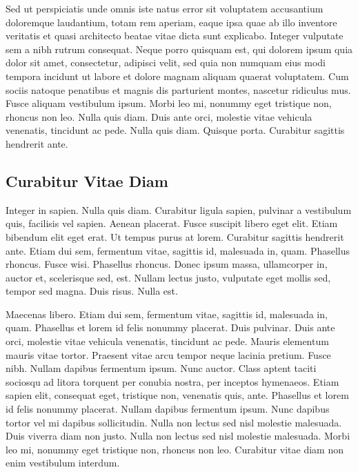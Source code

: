 Sed ut perspiciatis unde omnis iste natus error sit voluptatem accusantium doloremque laudantium, totam rem aperiam, eaque ipsa quae ab illo inventore veritatis et quasi architecto beatae vitae dicta sunt explicabo. Integer vulputate sem a nibh rutrum consequat. Neque porro quisquam est, qui dolorem ipsum quia dolor sit amet, consectetur, adipisci velit, sed quia non numquam eius modi tempora incidunt ut labore et dolore magnam aliquam quaerat voluptatem. Cum sociis natoque penatibus et magnis dis parturient montes, nascetur ridiculus mus. Fusce aliquam vestibulum ipsum. Morbi leo mi, nonummy eget tristique non, rhoncus non leo. Nulla quis diam. Duis ante orci, molestie vitae vehicula venenatis, tincidunt ac pede. Nulla quis diam. Quisque porta. Curabitur sagittis hendrerit ante.

\subsection{Curabitur Vitae Diam}
Integer in sapien. Nulla quis diam. Curabitur ligula sapien, pulvinar a vestibulum quis, facilisis vel sapien. Aenean placerat. Fusce suscipit libero eget elit. Etiam bibendum elit eget erat. Ut tempus purus at lorem. Curabitur sagittis hendrerit ante. Etiam dui sem, fermentum vitae, sagittis id, malesuada in, quam. Phasellus rhoncus. Fusce wisi. Phasellus rhoncus. Donec ipsum massa, ullamcorper in, auctor et, scelerisque sed, est. Nullam lectus justo, vulputate eget mollis sed, tempor sed magna. Duis risus. Nulla est.

Maecenas libero. Etiam dui sem, fermentum vitae, sagittis id, malesuada in, quam. Phasellus et lorem id felis nonummy placerat. Duis pulvinar. Duis ante orci, molestie vitae vehicula venenatis, tincidunt ac pede. Mauris elementum mauris vitae tortor. Praesent vitae arcu tempor neque lacinia pretium. Fusce nibh. Nullam dapibus fermentum ipsum. Nunc auctor. Class aptent taciti sociosqu ad litora torquent per conubia nostra, per inceptos hymenaeos. Etiam sapien elit, consequat eget, tristique non, venenatis quis, ante. Phasellus et lorem id felis nonummy placerat. Nullam dapibus fermentum ipsum. Nunc dapibus tortor vel mi dapibus sollicitudin. Nulla non lectus sed nisl molestie malesuada. Duis viverra diam non justo. Nulla non lectus sed nisl molestie malesuada. Morbi leo mi, nonummy eget tristique non, rhoncus non leo. Curabitur vitae diam non enim vestibulum interdum.

